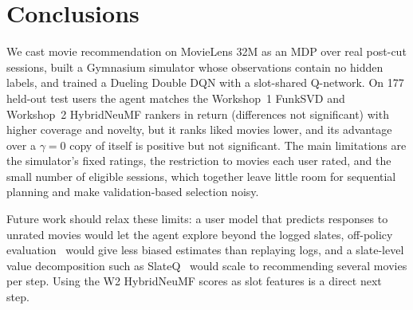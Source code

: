 \section{Conclusions}
\label{sec:conclusions}

We cast movie recommendation on MovieLens 32M as an MDP over real post-cut sessions, built a Gymnasium simulator whose observations contain no hidden labels, and trained a Dueling Double DQN with a slot-shared Q-network. On 177 held-out test users the agent matches the Workshop~1 FunkSVD and Workshop~2 HybridNeuMF rankers in return (differences not significant) with higher coverage and novelty, but it ranks liked movies lower, and its advantage over a $\gamma = 0$ copy of itself is positive but not significant. The main limitations are the simulator's fixed ratings, the restriction to movies each user rated, and the small number of eligible sessions, which together leave little room for sequential planning and make validation-based selection noisy.

Future work should relax these limits: a user model that predicts responses to unrated movies would let the agent explore beyond the logged slates, off-policy evaluation~\cite{levine2020offline} would give less biased estimates than replaying logs, and a slate-level value decomposition such as SlateQ~\cite{ie2019slateq} would scale to recommending several movies per step. Using the W2 HybridNeuMF scores as slot features is a direct next step.
